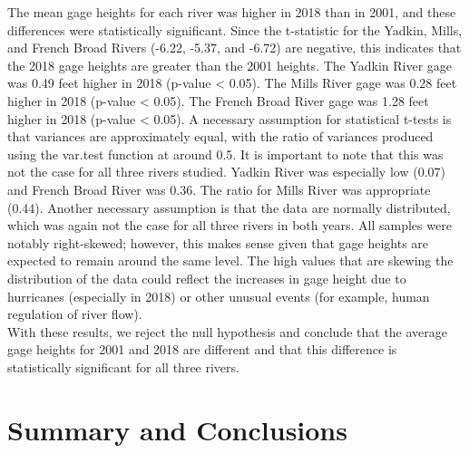 \documentclass[
  12pt,
]{article}
\begin{document}
The mean gage heights for each river was higher in 2018 than in 2001,
and these differences were statistically significant. Since the
t-statistic for the Yadkin, Mills, and French Broad Rivers (-6.22,
-5.37, and -6.72) are negative, this indicates that the 2018 gage
heights are greater than the 2001 heights. The Yadkin River gage was
0.49 feet higher in 2018 (p-value \textless{} 0.05). The Mills River
gage was 0.28 feet higher in 2018 (p-value \textless{} 0.05). The French
Broad River gage was 1.28 feet higher in 2018 (p-value \textless{}
0.05). A necessary assumption for statistical t-tests is that variances
are approximately equal, with the ratio of variances produced using the
var.test function at around 0.5. It is important to note that this was
not the case for all three rivers studied. Yadkin River was especially
low (0.07) and French Broad River was 0.36. The ratio for Mills River
was appropriate (0.44). Another necessary assumption is that the data
are normally distributed, which was again not the case for all three
rivers in both years. All samples were notably right-skewed; however,
this makes sense given that gage heights are expected to remain around
the same level. The high values that are skewing the distribution of the
data could reflect the increases in gage height due to hurricanes
(especially in 2018) or other unusual events (for example, human
regulation of river flow).\\
With these results, we reject the null hypothesis and conclude that the
average gage heights for 2001 and 2018 are different and that this
difference is statistically significant for all three rivers.

\newpage

\hypertarget{summary-and-conclusions}{%
\section{Summary and Conclusions}\label{summary-and-conclusions}}
\end{document}
